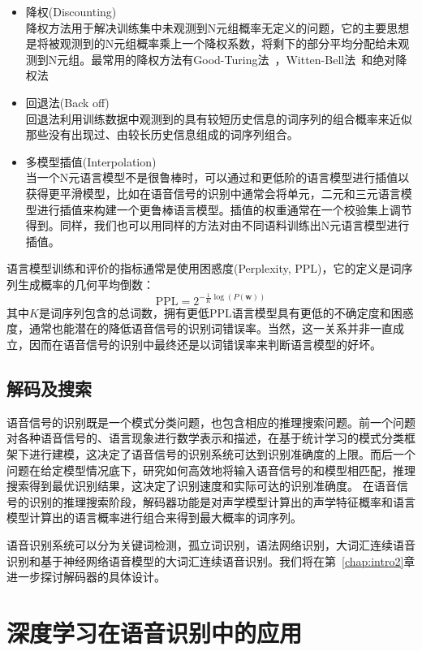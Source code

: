 \begin{itemize}
    \item 降权(Discounting) \\
    降权方法用于解决训练集中未观测到N元组概率无定义的问题，它的主要思想是将被观测到的N元组概率乘上一个降权系数，将剩下的部分平均分配给未观测到N元组。最常用的降权方法有Good-Turing法~\cite{good1953population,katz1987estimation}，Witten-Bell法~\cite{witten1991zero}和绝对降权法~\cite{ney1995estimation}
    \item 回退法(Back off) \\
    回退法利用训练数据中观测到的具有较短历史信息的词序列的组合概率来近似那些没有出现过、由较长历史信息组成的词序列组合。
    \item 多模型插值(Interpolation) \\
    当一个N元语言模型不是很鲁棒时，可以通过和更低阶的语言模型进行插值以获得更平滑模型，比如在语音信号的识别中通常会将单元，二元和三元语言模型进行插值来构建一个更鲁棒语言模型。插值的权重通常在一个校验集上调节得到。同样，我们也可以用同样的方法对由不同语料训练出N元语言模型进行插值。
\end{itemize}
语言模型训练和评价的指标通常是使用困惑度(Perplexity, PPL)，它的定义是词序列生成概率的几何平均倒数：
\begin{equation}
    \text{PPL}=2^{-\frac{1}{K}\log(P(\mathbf{w}))}
\end{equation}
其中$K$是词序列包含的总词数，拥有更低PPL语言模型具有更低的不确定度和困惑度，通常也能潜在的降低语音信号的识别词错误率。当然，这一关系并非一直成立，因而在语音信号的识别中最终还是以词错误率来判断语言模型的好坏。

\subsection{解码及搜索}
语音信号的识别既是一个模式分类问题，也包含相应的推理搜索问题。前一个问题对各种语音信号的、语言现象进行数学表示和描述，在基于统计学习的模式分类框架下进行建模，这决定了语音信号的识别系统可达到识别准确度的上限。而后一个问题在给定模型情况底下，研究如何高效地将输入语音信号的和模型相匹配，推理搜索得到最优识别结果，这决定了识别速度和实际可达的识别准确度。
在语音信号的识别的推理搜索阶段，解码器功能是对声学模型计算出的声学特征概率和语言模型计算出的语言概率进行组合来得到最大概率的词序列。

语音识别系统可以分为关键词检测，孤立词识别，语法网络识别，大词汇连续语音识别和基于神经网络语音模型的大词汇连续语音识别。我们将在第~\ref{chap:intro2}章进一步探讨解码器的具体设计。

\section{深度学习在语音识别中的应用}
\label{chap:intro2-dl-asr}

